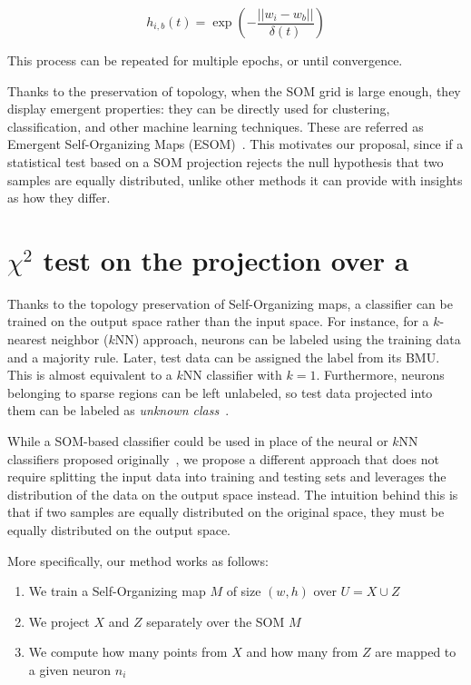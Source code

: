 \begin{equation}
    h_{i,b}(t) = \exp(- \frac{||w_i - w_b||}{\delta(t)})
\end{equation}

This process can be repeated for multiple epochs, or until convergence.

\medskip

Thanks to the preservation of topology, when the SOM grid is large enough, they display
emergent properties: they can be directly used for clustering, classification, and other
machine learning techniques. These are referred as Emergent Self-Organizing Maps (ESOM)~\cite{ultsch2005esom}. This motivates our proposal, since if a statistical test
based on a SOM projection rejects the null hypothesis that two samples are equally distributed,
unlike other methods it can provide with insights as how they differ.

\section{\texorpdfstring{$\chi^2$}{χ²} test on the projection over a }
\label{sec:som_chi2}

Thanks to the topology preservation of Self-Organizing maps, a classifier can be trained
on the output space rather than the input space. For instance, for a $k$-nearest neighbor ($k$NN)
approach, neurons can be labeled using the training data and a majority rule. Later, test data
can be assigned the label from its BMU. This is almost equivalent to a $k$NN classifier with $k=1$.
Furthermore, neurons belonging to sparse regions can be left unlabeled, so test data projected
into them can be labeled as \emph{unknown class}~\cite{ultsch2005esom,silva2011som}.

While a SOM-based classifier could be used in place of the neural or $k$NN classifiers proposed
originally~\cite{lopez2016revisiting}, we propose a different approach that does not require
splitting the input data into training and testing sets and leverages the distribution of the
data on the output space instead. The intuition behind this is that if two samples are equally
distributed on the original space, they must be equally distributed on the output space.

More specifically, our method works as follows:

\begin{enumerate}
    \item We train a Self-Organizing map $M$ of size $(w, h)$ over $U = X \cup Z$
    \item We project $X$ and $Z$ separately over the SOM $M$
    \item We compute how many points from $X$ and how many from $Z$ are mapped to a given neuron $n_i$
\end{enumerate}

